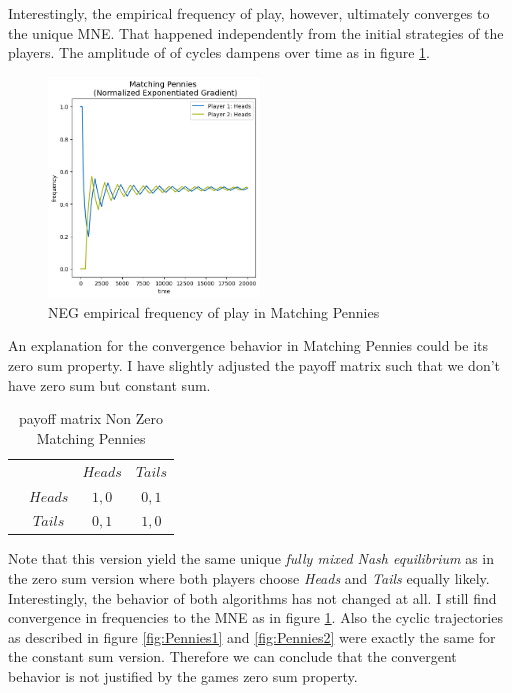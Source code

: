 Interestingly, the empirical frequency of play, however, ultimately converges to the unique MNE. That happened independently from the initial strategies of the players. The amplitude of of cycles dampens over time as in figure \ref{fig:Pennies3}.

\begin{figure}[H]
    \centering
    \includegraphics[width=0.5\textwidth]{logos/Pennies3.png}
    \caption{NEG empirical frequency of play in Matching Pennies}
    \label{fig:Pennies3}
\end{figure}

An explanation for the convergence behavior in Matching Pennies could be its zero sum property. I have slightly adjusted the payoff matrix such that we don't have zero sum but constant sum. 

\begin{table}[H]\centering
\setlength{\extrarowheight}{2pt}
\begin{tabular}{cc|c|c|}
  & \multicolumn{1}{c}{} & \multicolumn{1}{c}{$Heads$}  & \multicolumn{1}{c}{$Tails$} \\\cline{3-4}
  & $Heads$ & $1,0$ & $0,1$ \\\cline{3-4}
  & $Tails$ & $0,1$ & $1,0$ \\\cline{3-4}
\end{tabular}\caption{\label{tab:payoffNonZeroMachtingPennies}payoff matrix Non Zero Matching Pennies}
\end{table}

Note that this version yield the same unique \textit{fully mixed Nash equilibrium} as in the zero sum version where both players choose \textit{Heads} and \textit{Tails} equally likely. Interestingly, the behavior of both algorithms has not changed at all. I still find convergence in frequencies to the MNE as in figure \ref{fig:Pennies3}. Also the  cyclic trajectories as described in figure \ref{fig:Pennies1} and \ref{fig:Pennies2} were exactly the same for the constant sum version. Therefore we can conclude that the convergent behavior is not justified by the games zero sum property.


